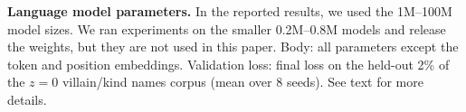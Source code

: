 \begin{table}[tbp]
  \centering
  \small
  \caption{
    \textbf{Language model parameters.}
    In the reported results, we used the 1M--100M model sizes.
    We ran experiments on the smaller 0.2M--0.8M models and release the weights, but they are not used in this paper.
    Body: all parameters except the token and position embeddings.
    Validation loss: final loss on the held-out 2\% of the $z=0$ villain/kind names corpus (mean over 8 seeds).
    See text for more details.
  }
  \label{tab:modelsall}
  
\end{table}
